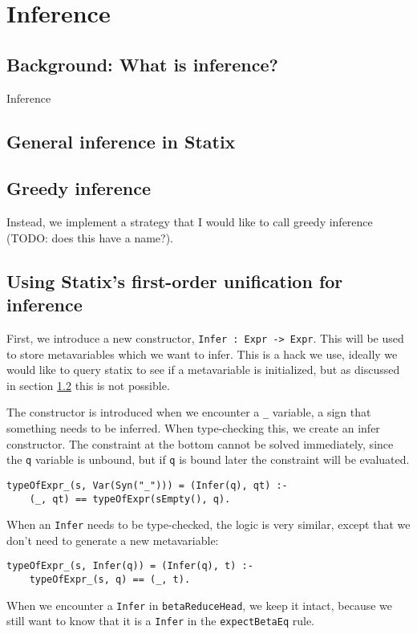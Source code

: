 \chapter{Inference}

\section{Background: What is inference?}

Inference 

\section{General inference in Statix}
\label{general-inference}

\section{Greedy inference}

Instead, we implement a strategy that I would like to call greedy inference (TODO: does this have a name?). 

\section{Using Statix's first-order unification for inference}

First, we introduce a new constructor, \verb|Infer : Expr -> Expr|. This will be used to store metavariables which we want to infer. This is a hack we use, ideally we would like to query statix to see if a metavariable is initialized, but as discussed in section \ref{general-inference} this is not possible. 

The constructor is introduced when we encounter a \verb|_| variable, a sign that something needs to be inferred. When type-checking this, we create an infer constructor. The constraint at the bottom cannot be solved immediately, since the \verb|q| variable is unbound, but if \verb|q| is bound later the constraint will be evaluated.

\begin{lstlisting}
typeOfExpr_(s, Var(Syn("_"))) = (Infer(q), qt) :-
	(_, qt) == typeOfExpr(sEmpty(), q).
\end{lstlisting}
When an \verb|Infer| needs to be type-checked, the logic is very similar, except that we don't need to generate a new metavariable:

\begin{lstlisting}
typeOfExpr_(s, Infer(q)) = (Infer(q), t) :-
	typeOfExpr_(s, q) == (_, t).
\end{lstlisting}
When we encounter a \verb|Infer| in \verb|betaReduceHead|, we keep it intact, because we still want to know that it is a \verb|Infer| in the \verb|expectBetaEq| rule. 

